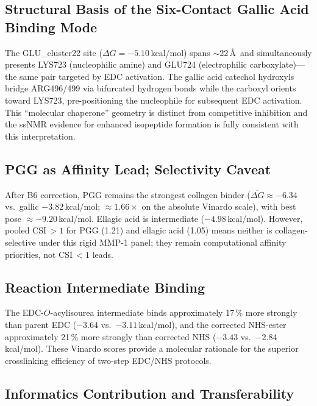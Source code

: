 \documentclass[11pt]{article}
\begin{document}
\subsection{Structural Basis of the Six-Contact Gallic Acid Binding Mode}

The GLU\_cluster22 site ($\Delta G = -5.10$\,kcal/mol) spans $\sim$22\,\AA\
and simultaneously presents LYS723 (nucleophilic amine) and GLU724
(electrophilic carboxylate)---the same pair targeted by EDC activation.
The gallic acid catechol hydroxyls bridge ARG496/499 via bifurcated hydrogen
bonds while the carboxyl orients toward LYS723, pre-positioning the
nucleophile for subsequent EDC activation.  This ``molecular chaperone''
geometry is distinct from competitive inhibition and the
ssNMR evidence for enhanced isopeptide formation is fully consistent with
this interpretation.

\subsection{PGG as Affinity Lead; Selectivity Caveat}

After B6 correction, PGG remains the strongest collagen binder
($\overline{\Delta G} \approx -6.34$ vs.\ gallic $-3.82$\,kcal/mol;
$\approx 1.66\times$ on the absolute Vinardo scale), with best pose
$\approx -9.20$\,kcal/mol.
Ellagic acid is intermediate ($-4.98$\,kcal/mol).
However, pooled CSI\,$> 1$ for PGG (1.21) and ellagic acid (1.05)
means neither is collagen-selective under this rigid MMP-1 panel;
they remain computational affinity priorities, not CSI\,$< 1$ leads.

\subsection{Reaction Intermediate Binding}

The EDC-$O$-acylisourea intermediate binds approximately 17\,\% more strongly
than parent EDC ($-3.64$ vs.\ $-3.11$\,kcal/mol), and the corrected NHS-ester
approximately 21\,\% more strongly than corrected NHS ($-3.43$ vs.\ $-2.84$\,kcal/mol).
These Vinardo scores provide a molecular rationale for the superior
crosslinking efficiency of two-step EDC/NHS protocols.

\subsection{Informatics Contribution and Transferability}
\label{sec:informatics_discuss}
\end{document}
